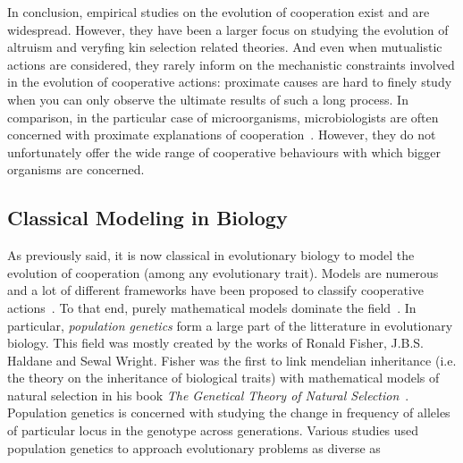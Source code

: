     In conclusion, empirical studies on the evolution of cooperation exist and are widespread. However, they have been a larger focus on studying the evolution of altruism and veryfing kin selection related theories. And even when mutualistic actions are considered, they rarely inform on the mechanistic constraints involved in the evolution of cooperative actions: proximate causes are hard to finely study when you can only observe the ultimate results of such a long process. In comparison, in the particular case of microorganisms, microbiologists are often concerned with proximate explanations of cooperation~\parencite{West2006}. However, they do not unfortunately offer the wide range of cooperative behaviours with which bigger organisms are concerned.



  \subsection{Classical Modeling in Biology}

    As previously said, it is now classical in evolutionary biology to model the evolution of cooperation (among any evolutionary trait). Models are numerous and a lot of different frameworks have been proposed to classify cooperative actions~\parencite{Dugatkin2002, Sachs2004, Lehmann2006}. To that end, purely mathematical models dominate the field~\parencite{Servedio2014}. In particular, \emph{population genetics} form a large part of the litterature in evolutionary biology. This field was mostly created by the works of Ronald Fisher, J.B.S. Haldane and Sewal Wright. Fisher was the first to link mendelian inheritance (i.e. the theory on the inheritance of biological traits) with mathematical models of natural selection in his book \textit{The Genetical Theory of Natural Selection}~\parencite{Fisher1930}. Population genetics is concerned with studying the change in frequency of alleles of particular locus in the genotype across generations. Various studies used population genetics to approach evolutionary problems as diverse as 
    

